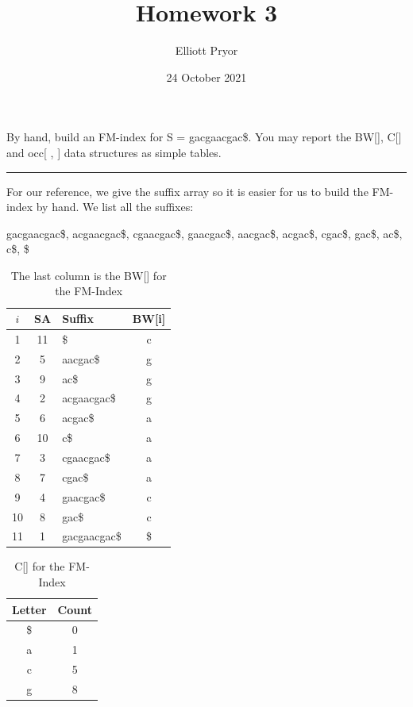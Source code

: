 \documentclass[11pt]{article}
\title{Homework 3}
\author{Elliott Pryor}
\date{24 October 2021}
\begin{document}
\maketitle


By hand, build an FM-index for S = gacgaacgac\$. You may report the BW[], C[] and occ[ , ] data structures as simple tables.

\hrule

For our reference, we give the suffix array so it is easier for us to build the FM-index by hand.
We list all the suffixes: 





gacgaacgac\$,
acgaacgac\$,
cgaacgac\$,
gaacgac\$,
aacgac\$,
acgac\$,
cgac\$,
gac\$,
ac\$,
c\$,
\$

\begin{table}[h]
    \centering
    \begin{tabular}{| c | c | l | c |}
        \hline
        $i$ & SA & Suffix & BW[i] \\ \hline
        1 & 11 & \$ & c \\
        2 & 5 & aacgac\$ & g \\
        3 & 9 & ac\$ & g \\
        4 & 2 & acgaacgac\$ & g \\
        5 & 6 & acgac\$ & a \\
        6 & 10 & c\$ & a \\
        7 & 3 & cgaacgac\$ & a \\
        8 & 7 & cgac\$ & a \\
        9 & 4 & gaacgac\$ & c \\
        10 & 8 & gac\$ & c \\
        11 & 1 & gacgaacgac\$ & \$ \\ \hline
    \end{tabular}
    \caption{The last column is the BW[] for the FM-Index}
\end{table}

\begin{table}[h]
    \centering
    \begin{tabular}{| c | c |}
        \hline
        Letter & Count \\ \hline
        \$ & 0 \\
        a & 1 \\
        c & 5 \\
        g & 8 \\ \hline
    \end{tabular}
    \caption{C[] for the FM-Index}
\end{table}
\end{document}
